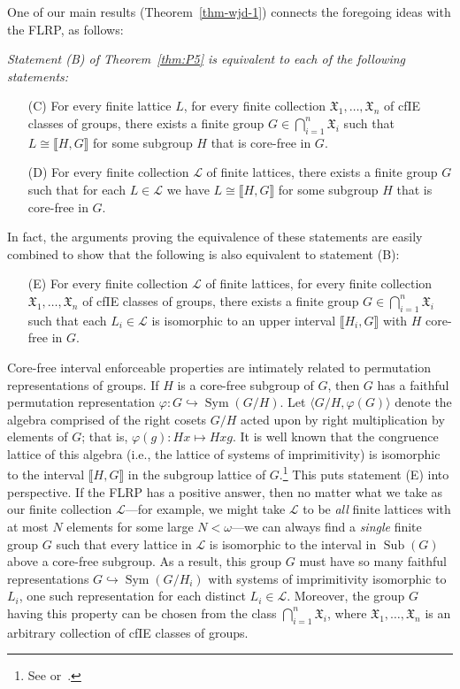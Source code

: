 \documentclass{gen-j-l}
\newcommand{\lb}{\ensuremath{\llbracket}}
\newcommand{\rb}{\ensuremath{\rrbracket}}
\newcommand{\<}{\ensuremath{\langle}}
\renewcommand{\>}{\ensuremath{\rangle}}
\theoremstyle{plain}
\theoremstyle{definition}
\theoremstyle{remark}
\numberwithin{theorem}{section}
\numberwithin{claim}{section}
\numberwithin{equation}{section}
\numberwithin{conjecture}{section}
\newcommand{\Con}{\ensuremath{\operatorname{Con}}}
\newcommand{\Sub}{\ensuremath{\operatorname{Sub}}}
\newcommand{\Sym}{\ensuremath{\operatorname{Sym}}}
\newcommand{\2}{\ensuremath{\mathbf{2}}}
\newcommand{\3}{\ensuremath{\mathbf{3}}}
\newcommand{\sG}{\ensuremath{\mathfrak{X}}}
\newcommand{\sL}{\ensuremath{\mathscr{L}}}
\renewcommand{\phi}{\ensuremath{\varphi}}
\begin{document}
One of our main results (Theorem~\ref{thm-wjd-1}) connects the
foregoing ideas with the \acs{FLRP}, as follows:\\[6pt]
{\it 
Statement (B) of Theorem~\ref{thm:P5} is equivalent to each of the following statements:
\begin{enumerate}
\item[(C)]
For every finite lattice $L$, for every finite collection $\sG_1, \dots, \sG_n$
of \acs{cfIE} classes of groups,
there exists a finite group $G \in \bigcap\limits_{i=1}^n \sG_i$ such that $L \cong
\lb H,G \rb$ for some subgroup $H$ that is core-free in $G$. %
\item[(D)]
For every finite collection $\sL$ of finite lattices, there exists a finite
group $G$ such that for each $L \in \sL$ we have 
$L\cong \lb H, G \rb$ for some subgroup $H$ that is core-free in $G$. %
\end{enumerate}}
In fact, the arguments proving the equivalence of these
statements are easily combined to show that the following is also equivalent to
statement (B):
{\it 
\begin{enumerate}
\item[(E)]
For every finite collection $\sL$ of finite lattices, for every finite
collection $\sG_1, \dots, \sG_n$ of \acs{cfIE} classes of groups, there exists a
finite group $G \in \bigcap\limits_{i=1}^n \sG_i$ such that each $L_i \in \sL$
is isomorphic to an upper interval $\lb H_i, G \rb$ with $H$ core-free in $G$.
\end{enumerate}
}

Core-free interval enforceable properties are intimately related to
permutation representations of groups.   
If $H$ is a core-free subgroup of $G$, then $G$ has a faithful permutation 
representation $\phi:G\hookrightarrow \Sym(G/H)$.
Let $\<G/H, \phi(G)\>$ denote the algebra comprised of the right cosets
$G/H$ acted upon by right multiplication by elements of $G$; that is,
$\phi(g): Hx \mapsto Hxg$.  It is
well known that the congruence lattice of this algebra (i.e., the lattice of
systems of imprimitivity) %
 is isomorphic to the interval $\lb H, G \rb$ in the subgroup
lattice of $G$.\footnote{See \cite[Lemma 4.20]{alvi:1987}
or~\cite[Theorem 1.5A]{Dixon:1996}.}
This puts statement (E) into perspective.
If the \acs{FLRP} has a positive answer, then no matter 
what we take as our finite collection $\sL$---for example, we
might take $\sL$ to be \emph{all} finite lattices with
at most $N$ elements for some large $N< \omega$---we can always find a \emph{single}
finite group $G$ such that every lattice in $\sL$ is isomorphic to the interval
in $\Sub(G)$ above a core-free subgroup.
As a result, this group $G$ must have so many faithful
representations  $G\hookrightarrow \Sym(G/H_i)$ with systems of imprimitivity
isomorphic to $L_i$,
one such
representation for each distinct $L_i\in \sL$.  Moreover, the group $G$ having
this property can be chosen from the class $\bigcap\limits_{i=1}^n \sG_i$, where 
$\sG_1, \dots, \sG_n$ is an arbitrary collection of \acs{cfIE} classes of groups.
\end{document}
